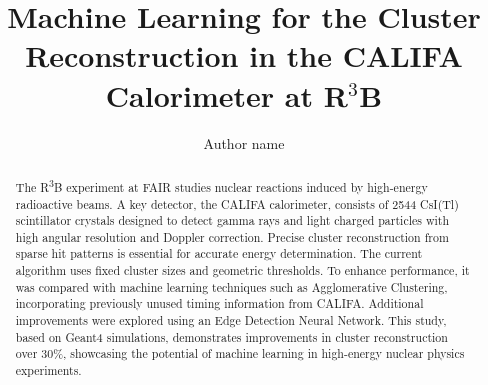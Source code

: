\documentclass[final,5p,times,twocolumn]{elsarticle}
\begin{document}
\begin{frontmatter}



\title{Machine Learning for the Cluster Reconstruction in the CALIFA Calorimeter at R$^3$B}


\author[first]{Author name}
\address[first]{organization={University of the Moon},%
            addressline={}, 
            city={Earth},
            postcode={}, 
            state={},
            country={}}

\begin{abstract}
The R\textsuperscript{3}B experiment at FAIR studies nuclear reactions induced by high-energy radioactive beams. A key detector, the CALIFA calorimeter, consists of 2544 CsI(Tl) scintillator crystals designed to detect gamma rays and light charged particles with high angular resolution and Doppler correction.\newline
Precise cluster reconstruction from sparse hit patterns is essential for accurate energy determination. The current algorithm uses fixed cluster sizes and geometric thresholds. To enhance performance, it was compared with machine learning techniques such as Agglomerative Clustering, incorporating previously unused timing information from CALIFA. Additional improvements were explored using an Edge Detection Neural Network.\newline
This study, based on Geant4 simulations, demonstrates improvements in cluster reconstruction over 30\%, showcasing the potential of machine learning in high-energy nuclear physics experiments.
\end{abstract}


\end{frontmatter}
\end{document}
